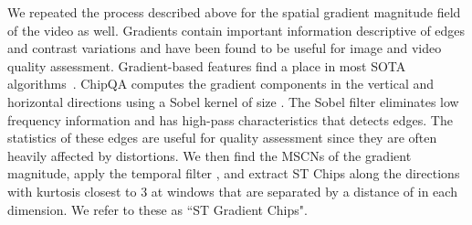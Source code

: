 \documentclass[journal]{IEEEtran}
\begin{document}
We repeated the process described above for the spatial gradient magnitude field of the video as well. Gradients contain important information descriptive of edges and contrast variations and have been found to be useful for image and video quality assessment. Gradient-based features find a place in most SOTA algorithms~\cite{tlvqm,friquee,videval,higrade}.  ChipQA computes the gradient components in the vertical and horizontal directions using a Sobel kernel of size . The Sobel filter eliminates low frequency information and has high-pass characteristics that detects edges. The statistics of these edges are useful for quality assessment since they are often heavily affected by distortions. We then find the MSCNs of the gradient magnitude, apply the temporal filter , and extract ST Chips along the directions with kurtosis closest to 3 at windows that are separated by a distance of  in each dimension. We refer to these as ``ST Gradient Chips".
\end{document}
